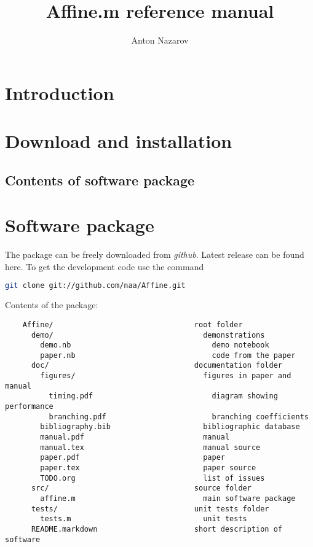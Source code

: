 \documentclass[preprint,12pt]{article}
\begin{document}
\title{{\bf Affine.m} reference manual}
\author{Anton Nazarov}

\begin{abstract}

\end{abstract}

\section{Introduction}
\label{sec:introduction-1}

\section{Download and installation}
\label{sec:downl-inst}

\subsection{Contents of software package}
\label{sec:cont-softw-pack}

\section{Software package}
\label{package}
The package can be freely downloaded from {\it github}. Latest release can be found here. To get the development code use the command
\begin{lstlisting}[language=bash]
 git clone git://github.com/naa/Affine.git
\end{lstlisting}

Contents of the package:
\begin{verbatim}
    Affine/                                root folder
      demo/                                  demonstrations
        demo.nb                                demo notebook
        paper.nb                               code from the paper
      doc/                                 documentation folder
        figures/                             figures in paper and manual
          timing.pdf                           diagram showing performance
          branching.pdf                        branching coefficients
        bibliography.bib                     bibliographic database
        manual.pdf                           manual
        manual.tex                           manual source
        paper.pdf                            paper
        paper.tex                            paper source
        TODO.org                             list of issues
      src/                                 source folder
        affine.m                             main software package
      tests/                               unit tests folder
        tests.m                              unit tests
      README.markdown                      short description of software
\end{verbatim}
\end{document}
